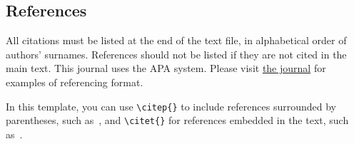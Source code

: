 \subsection{References}

All citations must be listed at the end of the text file,
in alphabetical order of authors' surnames.
References should not be listed if they are not cited in 
the main text.
This journal uses the APA system. 
Please visit 
\href{http://transactions.ismir.net/about/submissions/#References}{the journal}
for examples of referencing format.

In this template, you can use \verb=\citep{}= to include references 
surrounded by parentheses, such as~\citep{fakeref}, and \verb=\citet{}=
for references embedded in the text, such as~\citet{fakeref}.
